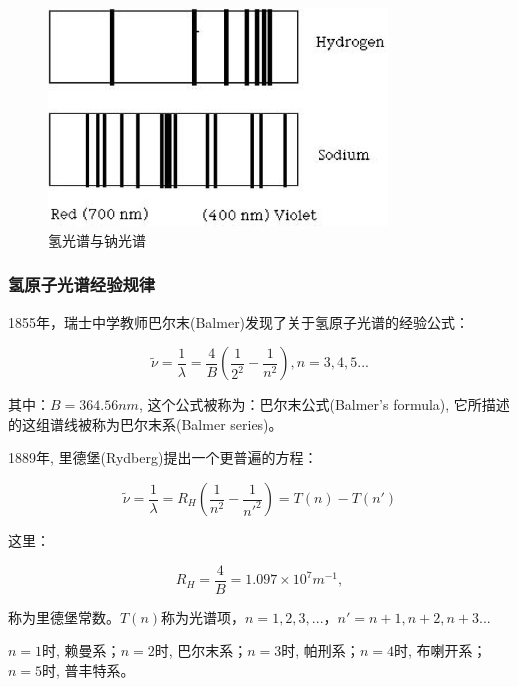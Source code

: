 \begin{figure}[h]
\begin{center}
\includegraphics[clip,width=9cm]{BohrModel/4-2.ps}
\caption{氢光谱与钠光谱}
\end{center}
\end{figure}

\subsubsection{氢原子光谱经验规律}

1855年，瑞士中学教师巴尔末(Balmer)发现了关于氢原子光谱的经验公式：

\begin{equation}\label{Balmer's formula}
    \tilde \nu  = \frac{1}{\lambda } = \frac{4}{B}\left( {\frac{1}{{2^2 }} - \frac{1}{{n^2 }}} \right),n = 3,4,5...
\end{equation}


其中：$B=364.56nm$, 这个公式被称为：巴尔末公式(Balmer's formula),
它所描述的这组谱线被称为巴尔末系(Balmer series)。


1889年, 里德堡(Rydberg)提出一个更普遍的方程：

\begin{equation}\label{Rydberg's formula}
    \tilde \nu  = \frac{1}{\lambda } = R_H \left( {\frac{1}{{n^2 }} - \frac{1}{{n'^2 }}} \right) = T(n) - T(n')
\end{equation}

这里：

\begin{equation}
R_H  = \frac{4}{B} = 1.097 \times 10^7 m^{ - 1},
\end{equation}

称为里德堡常数。$T(n)$称为光谱项，$n=1,2,3, ...$，$n' = n + 1,n + 2,n + 3...$

$n=1$时, 赖曼系；$n=2$时, 巴尔末系；$n=3$时, 帕刑系；$n=4$时,
布喇开系；$n=5$时, 普丰特系。

